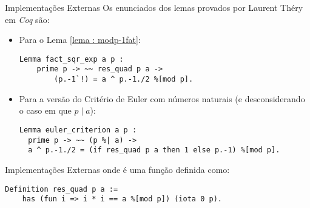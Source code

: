 \begin{frame}[fragile]{Implementações Externas}
    Os enunciados dos lemas provados por Laurent Théry em \textit{Coq} são:
    \begin{itemize}
        \item Para o Lema \ref{lema : modp-1fat}:
            \begin{lstlisting}[language=coq,frame=single,tabsize=1]
Lemma fact_sqr_exp a p :
    prime p -> ~~ res_quad p a -> 
        (p.-1`!) = a ^ p.-1./2 %[mod p].              
            \end{lstlisting}
        \item Para a versão do Critério de Euler com números naturais (e desconsiderando o caso em que $p \mid a$):
            \begin{lstlisting}[language=coq,frame=single,tabsize=1]
Lemma euler_criterion a p : 
  prime p -> ~~ (p %| a) -> 
  a ^ p.-1./2 = (if res_quad p a then 1 else p.-1) %[mod p].
            \end{lstlisting}
    \end{itemize}
\end{frame}

\begin{frame}[fragile]{Implementações Externas}
onde  é uma função definida como:
    \begin{lstlisting}[language=coq,frame=single,tabsize=1]
Definition res_quad p a := 
    has (fun i => i * i == a %[mod p]) (iota 0 p).
    \end{lstlisting}
\end{frame}

